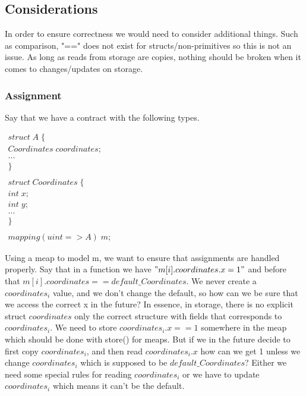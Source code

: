 \documentclass{article}
\begin{document}
	\subsection{Considerations}
	In order to ensure correctness we would need to consider additional things. Such as comparison, "==" does not exist for structs/non-primitives so this is not an issue. As long as reads from storage are copies, nothing should be broken when it comes to changes/updates on storage. 
	
	
	\subsubsection{Assignment}
	Say that we have a contract with the following types. 
	
	$
	\begin{array}{l}
		struct\; A\; \{ \\
		Coordinates\; coordinates; \\
		... \\
		\} \\
		\\
		
		struct\; Coordinates\; \{ \\
		int\; x; \\
	    int\; y; \\
	    ... \\
		\} \\
		\\
		mapping(uint => A)\; m;
	\end{array}	
	$
	
	Using a meap to model m, we want to ensure that assignments are handled properly. Say that in a function we have $"m[i].coordinates.x = 1"$ and before that $m[i].coordinates == default\_Coordinates$. We never create a $coordinates_i$ value, and we don't change the default, so how can we be sure that we access the correct x in the future? In essence, in storage, there is no explicit struct $coordinates$ only the correct structure with fields that corresponds to $coordinates_i$. We need to store $coordinates_i.x == 1$ somewhere in the meap which should be done with store() for meaps. But if we in the future decide to first copy $coordinates_i$, and then read $coordinates_i.x$ how can we get 1 unless we change $coordinates_i$ which is supposed to be $default\_Coordinates$? Either we need some special rules for reading $coordinates_i$ or we have to update $coordinates_i$ which means it can't be the default. 
	
\end{document}
